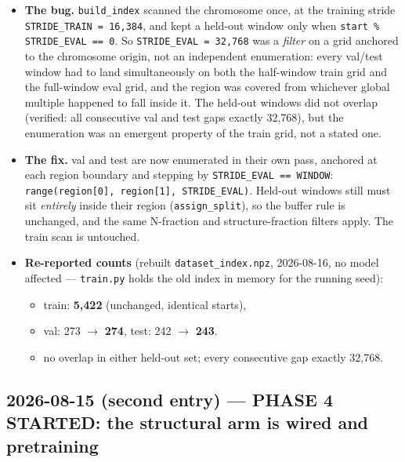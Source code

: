 \documentclass[11pt,a4paper]{article}
\newcommand{\code}[1]{\texttt{\small #1}}
\begin{document}
\begin{itemize}
\item \textbf{The bug.} \code{build\_index} scanned the chromosome once, at the
training stride \code{STRIDE\_TRAIN = 16{,}384}, and kept a held-out window only
when \code{start \% STRIDE\_EVAL == 0}. So \code{STRIDE\_EVAL = 32{,}768} was a
\emph{filter} on a grid anchored to the chromosome origin, not an independent
enumeration: every val/test window had to land simultaneously on both the
half-window train grid and the full-window eval grid, and the region was covered
from whichever global multiple happened to fall inside it. The held-out windows
did not overlap (verified: all consecutive val and test gaps exactly 32{,}768),
but the enumeration was an emergent property of the train grid, not a stated one.

\item \textbf{The fix.} val and test are now enumerated in their own pass,
anchored at each region boundary and stepping by \code{STRIDE\_EVAL == WINDOW}:
\code{range(region[0], region[1], STRIDE\_EVAL)}. Held-out windows still must sit
\emph{entirely} inside their region (\code{assign\_split}), so the buffer rule is
unchanged, and the same N-fraction and structure-fraction filters apply. The
train scan is untouched.

\item \textbf{Re-reported counts} (rebuilt \code{dataset\_index.npz},
2026-08-16, no model affected --- \code{train.py} holds the old index in memory
for the running seed):
\begin{itemize}
\item train: \textbf{5{,}422} (unchanged, identical starts),
\item val: 273 $\rightarrow$ \textbf{274}, test: 242 $\rightarrow$ \textbf{243}.
\item no overlap in either held-out set; every consecutive gap exactly 32{,}768.
\end{itemize}
\end{itemize}

\subsection*{2026-08-15 (second entry) --- PHASE 4 STARTED: the structural arm
is wired and pretraining}
\end{document}
